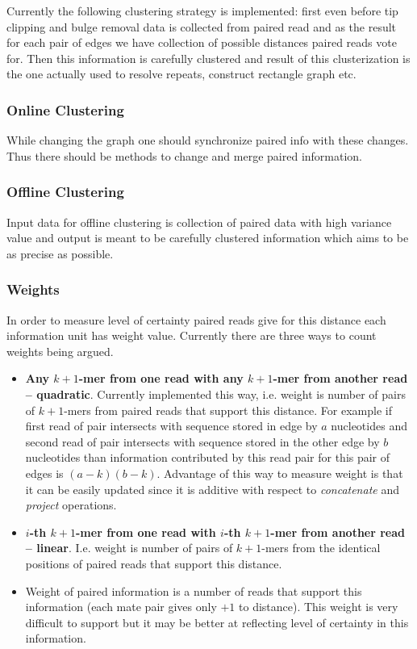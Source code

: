 \documentclass[12pt]{article}
\begin{document}
Currently the following clustering strategy is implemented: first even before tip clipping and bulge removal data is collected from paired read and as the result for each pair of edges we have collection of possible distances paired reads vote for. Then this information is carefully clustered and result of this clusterization is the one actually used to resolve repeats, construct rectangle graph etc.

\subsubsection{Online Clustering}

While changing the graph one should synchronize paired info with these changes. Thus there should be methods to change and merge paired information.

\subsubsection{Offline Clustering}

Input data for offline clustering is collection of paired data with high variance value and output is meant to be carefully clustered information which aims to be as precise as possible.

\subsubsection{Weights}
In order to measure level of certainty paired reads give for this distance each information unit has weight value. Currently there are three ways to count weights being argued.

\begin{itemize}
\item \textbf{Any $k+1$-mer from one read with any $k+1$-mer from another read -- quadratic}. Currently implemented this way, i.e. weight is number of pairs of $k+1$-mers from paired reads that support this distance. For example if first read of pair intersects with sequence stored in edge by $a$ nucleotides and second read of pair intersects with sequence stored in the other edge by $b$ nucleotides than information contributed by this read pair for this pair of edges is $(a - k)(b - k)$. Advantage of this way to measure weight is that it can be easily updated since it is additive with respect to \textit{concatenate} and \textit{project} operations.
\item  \textbf{$i$-th $k+1$-mer from one read with $i$-th $k+1$-mer from another read -- linear}. I.e. weight is number of pairs of $k+1$-mers from the identical positions of paired reads that support this distance.
\item Weight of paired information is a number of reads that support this information (each mate pair gives only $+1$ to distance). This weight is very difficult to support but it may be better at reflecting level of certainty in this information.
\end{itemize}
\end{document}
